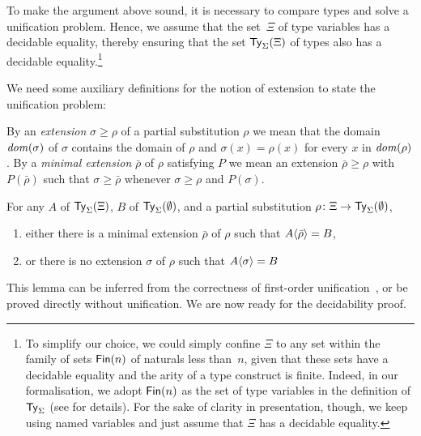 \begin{remark}
To make the argument above sound, it is necessary to compare types and solve a unification problem.
Hence, we assume that the set~$\Xi$ of type variables has a decidable equality, thereby ensuring that the set $\mathsf{Ty}_{\Sigma}(\Xi)$ of types also has a decidable equality.\footnote{%
To simplify our choice, we could simply confine $\Xi$ to any set within the family of sets $\mathsf{Fin}(n)$ of naturals less than~$n$, given that these sets have a decidable equality and the arity of a type construct is finite.
Indeed, in our formalisation, we adopt $\mathsf{Fin}(n)$ as the set of type variables in the definition of $\mathsf{Ty}_{\Sigma}$ (see  for details).
For the sake of clarity in presentation, though, we keep using named variables and just assume that $\Xi$ has a decidable equality.}
\end{remark}
We need some auxiliary definitions for the notion of extension to state the unification problem:
\begin{definition}
By an \emph{extension}\/ $\sigma \geq \rho$ of a partial substitution $\rho$ we mean that the domain $\mathit{dom}(\sigma)$ of $\sigma$ contains the domain of $\rho$ and $\sigma(x) = \rho(x)$ for every\/ $x$ in $\mathit{dom}(\rho)$.
  By a \emph{minimal extension}\/ $\bar{\rho}$ of $\rho$ satisfying $P$ we mean an extension $\bar{\rho} \geq \rho$ with $P(\bar{\rho})$ such that $\sigma \geq \bar{\rho}$ whenever $\sigma \geq \rho$ and $P(\sigma)$.
\end{definition}
\begin{lemma}\label{lem:unify}
  For any\/ $A$ of\/ $\mathsf{Ty}_{\Sigma}(\Xi)$, $B$ of\/ $\mathsf{Ty}_{\Sigma}(\emptyset)$, and a partial substitution\/ $\rho \colon \Xi \to \mathsf{Ty}_{\Sigma}(\emptyset)$, 
  \begin{enumerate}
    \item either there is a minimal extension\/ $\bar{\rho}$ of\/ $\rho$ such that\/ ${A}\!\left<{\bar{\rho}}\right> = B$,
    \item or there is no extension\/ $\sigma$ of\/ $\rho$ such that\/ ${A}\!\left<{\sigma}\right> = B$
  \end{enumerate}
\end{lemma}
This lemma can be inferred from the correctness of first-order unification~\citep{McBride2003,McBride2003a}, or be proved directly without unification.
We are now ready for the decidability proof.

